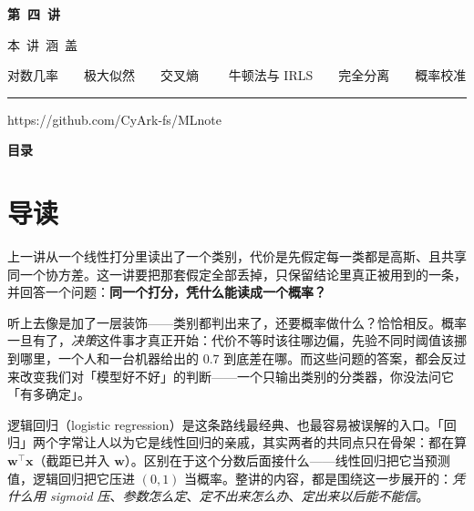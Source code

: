 \documentclass[11pt,a4paper,fontset=windows,zihao=-4]{ctexart}
\makeatletter
\newcommand{\bw}{\mathbf{w}}
\newcommand{\bx}{\mathbf{x}}
\newcommand{\tp}{^{\top}}
\renewcommand{\tableofcontents}{%
  \par\begingroup
    \sffamily\Large\bfseries\color{navy}目\quad 录\par
  \endgroup
  \vspace{0.85em}
  \setlength{\parskip}{0pt}%
  \@starttoc{toc}%
}
\makeatother
\begin{document}
\begin{titlepage}
\vspace*{3.10cm}
{\color{goldlight}\sffamily\bfseries\Large 第\ 四\ 讲\par}
\vspace{1.05cm}
{\color{steel}\sffamily\footnotesize 本\ 讲\ 涵\ 盖\par}
\vspace{0.26cm}
{\color{grey}\footnotesize 对数几率\ \ \textperiodcentered\ \ 极大似然\ \ \textperiodcentered\ \ 交叉熵
 \ \ \textperiodcentered\ \ 牛顿法与 IRLS\ \ \textperiodcentered\ \ 完全分离\ \ \textperiodcentered\ \ 概率校准\par}

\vspace{3.55cm}
{\color{navy!30}\rule{3.0cm}{0.4pt}\par}
\vspace{0.32cm}
{\color{grey}\footnotesize https://github.com/CyArk-fs/MLnote\par}
\end{titlepage}

\setcounter{page}{1}

\tableofcontents
\thispagestyle{plain}
\clearpage

\setcounter{page}{1}

\section*{导\quad 读}

上一讲从一个线性打分里读出了一个类别，代价是先假定每一类都是高斯、且共享同一个协方差。这一讲要把那套假定全部丢掉，只保留结论里真正被用到的一条，并回答一个问题：\textbf{同一个打分，凭什么能读成一个概率？}

听上去像是加了一层装饰——类别都判出来了，还要概率做什么？恰恰相反。概率一旦有了，\emph{决策}这件事才真正开始：代价不等时该往哪边偏，先验不同时阈值该挪到哪里，一个人和一台机器给出的 $0.7$ 到底差在哪。而这些问题的答案，都会反过来改变我们对「模型好不好」的判断——一个只输出类别的分类器，你没法问它「有多确定」。

逻辑回归（logistic regression）是这条路线最经典、也最容易被误解的入口。「回归」两个字常让人以为它是线性回归的亲戚，其实两者的共同点只在骨架：都在算 $\bw\tp\bx$（截距已并入 $\bw$）。区别在于这个分数后面接什么——线性回归把它当预测值，逻辑回归把它压进 $(0,1)$ 当概率。整讲的内容，都是围绕这一步展开的：\emph{凭什么用 sigmoid 压}、\emph{参数怎么定}、\emph{定不出来怎么办}、\emph{定出来以后能不能信}。
\end{document}
